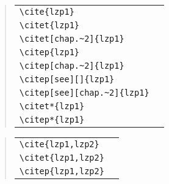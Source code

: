 \documentclass[UTF8,a4paper,zihao=5]{ctexart}
\begin{document}
\begin{quote}
\begin{tabular}{l@{\quad$\Rightarrow$\quad}l}
  \verb|\cite{lzp1}| & \cite{lzp1}\\
  \verb|\citet{lzp1}| & \citet{lzp1}\\
  \verb|\citet[chap.~2]{lzp1}| & \citet[chap.~2]{lzp1}\\[0.5ex]
  \verb|\citep{lzp1}| & \citep{lzp1}\\
  \verb|\citep[chap.~2]{lzp1}| & \citep[chap.~2]{lzp1}\\
  \verb|\citep[see][]{lzp1}| & \citep[see][]{lzp1}\\
  \verb|\citep[see][chap.~2]{lzp1}| & \citep[see][chap.~2]{lzp1}\\[0.5ex]
  \verb|\citet*{lzp1}| & \citet*{lzp1}\\
  \verb|\citep*{lzp1}| & \citep*{lzp1}
\end{tabular}
\end{quote}
\begin{quote}
\begin{tabular}{l@{\quad$\Rightarrow$\quad}l}
  \verb|\cite{lzp1,lzp2}| & \cite{lzp1,lzp2}\\
  \verb|\citet{lzp1,lzp2}| & \citet{lzp1,lzp2}\\
  \verb|\citep{lzp1,lzp2}| & \citep{lzp1,lzp2}
\end{tabular}
\end{quote}

\nocite{*}


\end{document}
